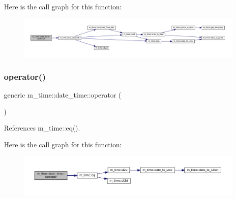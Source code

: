 Here is the call graph for this function\+:\nopagebreak
\begin{figure}[H]
\begin{center}
\leavevmode
\includegraphics[width=350pt]{structm__time_1_1date__time_ad51508db1d161547062f40dcd91f4e4b_cgraph}
\end{center}
\end{figure}
\mbox{\label{structm__time_1_1date__time_a67028b37f0375d0209cb6379c59d99e5}} 
\subsubsection{\texorpdfstring{operator()}{operator()}\hspace{0.1cm}{\footnotesize\ttfamily [2/9]}}
{\footnotesize\ttfamily generic m\+\_\+time\+::date\+\_\+time\+::operator (\begin{DoxyParamCaption}{ }\end{DoxyParamCaption})\hspace{0.3cm}{\ttfamily [private]}}



References m\+\_\+time\+::eq().

Here is the call graph for this function\+:\nopagebreak
\begin{figure}[H]
\begin{center}
\leavevmode
\includegraphics[width=350pt]{structm__time_1_1date__time_a67028b37f0375d0209cb6379c59d99e5_cgraph}
\end{center}
\end{figure}
\mbox{\label{structm__time_1_1date__time_afd5a2b9837bc8d48eb244bd07c200c6a}} 
